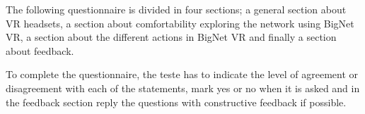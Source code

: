 The following questionnaire is divided in four sections; a general section about VR headsets, a section about comfortability exploring the network using BigNet VR, a section about the different actions in BigNet VR and finally a section about feedback.

To complete the questionnaire, the teste has to indicate the level of agreement or disagreement with each of the  statements, mark yes or no when it is asked and in the feedback section reply the questions with constructive feedback if possible.\\


%
%
%
%
%
%
%
